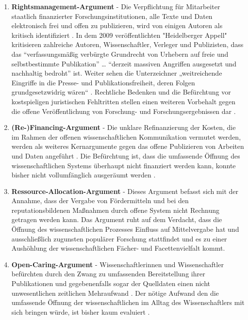 \begin{enumerate}
\item \textbf{Rightsmanagement-Argument} - Die Verpflichtung für Mitarbeiter staatlich finanzierter Forschungsinstitutionen, alle Texte und Daten elektronisch frei und offen zu publizieren, wird von einigen Autoren als kritisch identifiziert \cite{suchen}. In dem 2009 veröffentlichten "Heidelberger Appell" \cite{faz_heidelberger_apell_2009} kritisieren zahlreiche Autoren, Wissenschaftler, Verleger und Publizisten, dass das “verfassungsmäßig verbürgte Grundrecht von Urhebern auf freie und selbstbestimmte Publikation” … “derzeit massiven Angriffen ausgesetzt und nachhaltig bedroht” ist. Weiter sehen die Unterzeichner „weitreichende Eingriffe in die Presse- und Publikationsfreiheit, deren Folgen grundgesetzwidrig wären“ \cite{ITK_2009}. Rechtliche Bedenken und die Befürchtung vor kostspieligen juristischen Fehltritten stellen einen weiteren Vorbehalt gegen die offene Veröffentlichung von Forschung- und Forschungsergebnissen dar \cite{weishaupt_2009_goldenOA}.
\item \textbf{(Re-)Financing-Argument} - Die unklare Refinanzierung der Kosten, die im Rahmen der offenen wissenschaftlichen Kommunikation vermutet werden, werden als weiteres Kernargumente gegen das offene Publizieren von Arbeiten und Daten angeführt \cite{Chibnik_2015}. Die Befürchtung ist, dass die umfassende Öffnung des wissenschaftlichen Systems überhaupt nicht finanziert werden kann, konnte bisher nicht vollumfänglich ausgeräumt werden \cite{weishaupt_2009_goldenOA}.
\item \textbf{Ressource-Allocation-Argument} - Dieses Argument befasst sich mit der Annahme, dass der Vergabe von Fördermitteln und bei den reputationsbildenen Maßnahmen durch offene System nicht Rechnung getragen werden kann. Das Argument ruht auf dem Verdacht, dass die Öffnung des wissenschaftlichen Prozesses Einfluss auf Mittelvergabe hat \cite{grand_2012_open} und ausschließlich zugunsten populärer Forschung stattfindet und es zu einer Aushöhlung der wissenschaftlichen Fächer- und Facettenvielfalt kommt.
\item \textbf{Open-Caring-Argument} - Wissenschaftlerinnen und Wissenschaftler befürchten durch den Zwang zu umfassenden Bereitstellung ihrer Publikationen und gegebenenfalls sogar der Quelldaten einen nicht unwesentlichen zeitlichen Mehraufwand \cite{bbaw_publizieren_2015} \cite{grand_2012_open}. Der nötige Aufwand den die umfassende Öffnung der wissenschaftlichen im Alltag des Wissenschaftlers mit sich bringen würde, ist bisher kaum evaluiert \cite{osterloh2008anreize}.

\end{enumerate}
